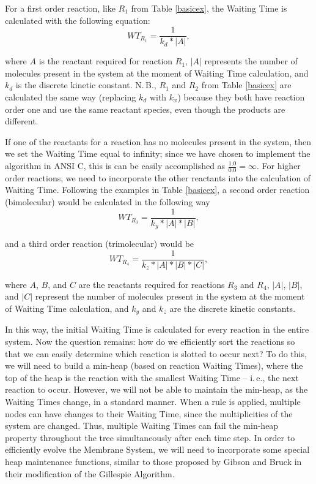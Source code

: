 \documentclass[copyright]{eptcs}
\newcommand{\noi}{\noindent}
\begin{document}
For a first order reaction, like $R_1$ from Table \ref{basicex}, the Waiting Time is calculated with the following equation:
\begin{equation}
WT_{R_1}=\frac{1}{k_d*|A|},
\label{wt1}
\end{equation}

\noi where $A$ is the reactant required for reaction $R_1$, $|A|$ represents the number of molecules present in the system at the moment of Waiting Time calculation, and~$k_d$ is the discrete kinetic constant.  N.\,B., $R_1$ and $R_2$ from Table \ref{basicex} are calculated the same way (replacing $k_d$ with $k_x$) because they both have reaction order one and use the same reactant species, even though the products are different.

If one of the reactants for a reaction has no molecules present in the system, then we set the Waiting Time equal to infinity; since we have chosen to implement the algorithm in ANSI C, this is can be easily accomplished as $\frac{1.0}{0.0}=\infty$.  For higher order reactions, we need to incorporate the other reactants into the calculation of Waiting Time.  Following the examples in Table \ref{basicex}, a second order reaction (bimolecular) would be calculated in the following way
\begin{equation}
WT_{R_3}=\frac{1}{k_y*|A|*|B|},
\label{wt2}
\end{equation}


\noi and a third order reaction (trimolecular) would be
\begin{equation}
WT_{R_4}=\frac{1}{k_z*|A|*|B|*|C|},
\label{wt3}
\end{equation}

\noi where $A$, $B$, and $C$ are the reactants required for reactions $R_3$ and $R_4$, $|A|$, $|B|$, and $|C|$ represent the number of molecules present in the system at the moment of Waiting Time calculation, and $k_y$ and $k_z$ are the discrete kinetic constants.

In this way, the initial Waiting Time is calculated for every reaction in the entire system.  Now the question remains: how do we efficiently sort the reactions so that we can easily determine which reaction is slotted to occur next?  To do this, we will need to build a min-heap (based on reaction Waiting Times), where the top of the heap is the reaction with the smallest Waiting Time -- i.\,e., the next reaction to occur.   However, we will not be able to maintain the min-heap, as the Waiting Times change, in a standard manner.   When a rule is applied, multiple nodes can have changes to their Waiting Time, since the multiplicities of the system are changed.  Thus, multiple Waiting Times can fail the min-heap property throughout the tree simultaneously after each time step.  In order to efficiently evolve the Membrane System, we will need to incorporate some special heap maintenance functions, similar to those proposed by Gibson and Bruck \cite{gibson00} in their modification of the Gillespie Algorithm.
\end{document}
